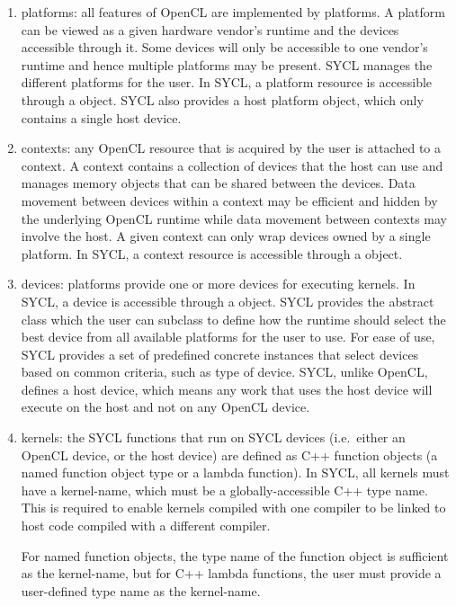 \begin{enumerate}
\item \Glspl{platform}: all features of OpenCL are implemented by platforms.
A platform can be viewed as a given hardware vendor's runtime and the devices
accessible through it. Some devices will only be accessible to one vendor's
runtime and hence multiple platforms may be present. SYCL manages the different
platforms for the user. In SYCL, a platform resource is accessible through a
 object. SYCL also provides a host platform
object, which only contains a single host device.

\item \Glspl{context}: any OpenCL resource that is acquired by the user is
attached to a context. A context contains a collection of devices that the host
can use and manages memory objects that can be shared between the devices. Data
movement between devices within a context may be efficient and hidden by the
underlying OpenCL runtime while data movement between contexts 
may involve the host. A given context can only wrap devices owned 
by a single platform. In SYCL, a context resource is accessible through a 
object.

\item \Glspl{device}: platforms provide one or more devices for executing
kernels. In SYCL, a device is accessible through a 
object. SYCL provides the abstract  class
which the user can subclass to define how the runtime should select the best
device from all available platforms for the user to use. For ease of use, SYCL
provides a set of predefined concrete  instances
that select devices based on common criteria, such as type of device. SYCL,
unlike OpenCL, defines a host device, which means any work that uses the host
device will execute on the host and not on any OpenCL device.

\item \Glspl{kernel}: the SYCL functions that run on SYCL devices (i.e.\ 
either an OpenCL device, or the host device) are defined as C++ function
objects (a named function object type or a lambda function).
In SYCL, all kernels must have a \gls{kernel-name}, which must be a
globally-accessible C++ type name. This is required to enable kernels compiled
with one compiler to be linked to host code compiled with a different compiler.

For named function objects, the type name of the function object is sufficient
as the \gls{kernel-name}, but for C++ lambda functions, the user must
provide a user-defined type name as the \gls{kernel-name}.


\end{enumerate}
